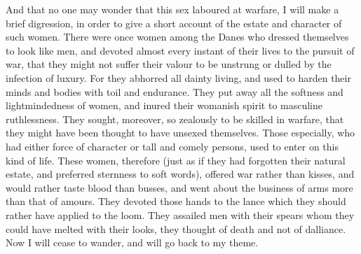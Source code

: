 \documentclass[10pt,a4paper]{report}
\begin{document}
And that no one may wonder that this sex laboured at warfare, I will make a brief digression, in order to give a short account of the estate and character of such women. There were once women among the Danes who dressed themselves to look like men, and devoted almost every instant of their lives to the pursuit of war, that they might not suffer their valour to be unstrung or dulled by the infection of luxury. For they abhorred all dainty living, and used to harden their minds and bodies with toil and endurance. They put away all the softness and lightmindedness of women, and inured their womanish spirit to masculine ruthlessness. They sought, moreover, so zealously to be skilled in warfare, that they might have been thought to have unsexed themselves. Those especially, who had either force of character or tall and comely persons, used to enter on this kind of life. These women, therefore (just as if they had forgotten their natural estate, and preferred sternness to soft words), offered war rather than kisses, and would rather taste blood than busses, and went about the business of arms more than that of amours. They devoted those hands to the lance which they should rather have applied to the loom. They assailed men with their spears whom they could have melted with their looks, they thought of death and not of dalliance. Now I will cease to wander, and will go back to my theme.\\
\end{document}
